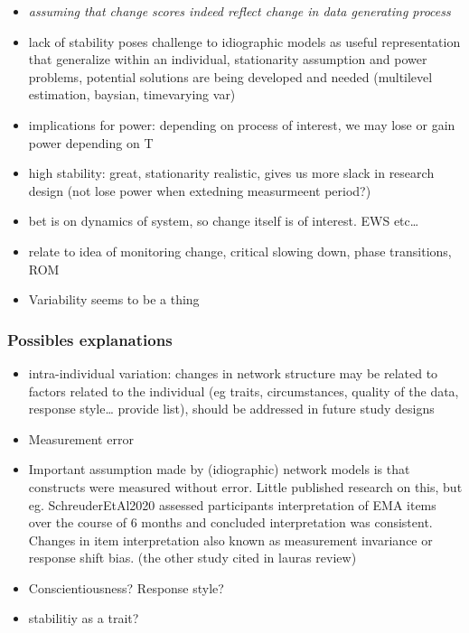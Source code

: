 \documentclass[
  english,
  man]{apa6}
\providecommand{\tightlist}{%
  \setlength{\itemsep}{0pt}\setlength{\parskip}{0pt}}
\begin{document}
\begin{itemize}
\item
  \emph{assuming that change scores indeed reflect change in data generating process}
\item
  lack of stability poses challenge to idiographic models as useful representation that generalize within an individual, stationarity assumption and power problems, potential solutions are being developed and needed (multilevel estimation, baysian, timevarying var)
\item
  implications for power: depending on process of interest, we may lose or gain power depending on T
\item
  high stability: great, stationarity realistic, gives us more slack in research design (not lose power when extedning measurmeent period?)
\item
  bet is on dynamics of system, so change itself is of interest.
  EWS etc\ldots{}
\item
  relate to idea of monitoring change, critical slowing down, phase transitions, ROM
\item
  Variability seems to be a thing
\end{itemize}

\hypertarget{possibles-explanations}{%
\subsubsection{Possibles explanations}\label{possibles-explanations}}

\begin{itemize}
\tightlist
\item
  intra-individual variation: changes in network structure may be related to factors related to the individual (eg traits, circumstances, quality of the data, response style\ldots{} provide list), should be addressed in future study designs
\item
  Measurement error
\item
  Important assumption made by (idiographic) network models is that constructs were measured without error. Little published research on this, but eg. SchreuderEtAl2020 assessed participants interpretation of EMA items over the course of 6 months and concluded interpretation was consistent. Changes in item interpretation also known as measurement invariance or response shift bias. (the other study cited in lauras review)
\item
  Conscientiousness? Response style?
\item
  stabilitiy as a trait?
\end{itemize}
\end{document}

